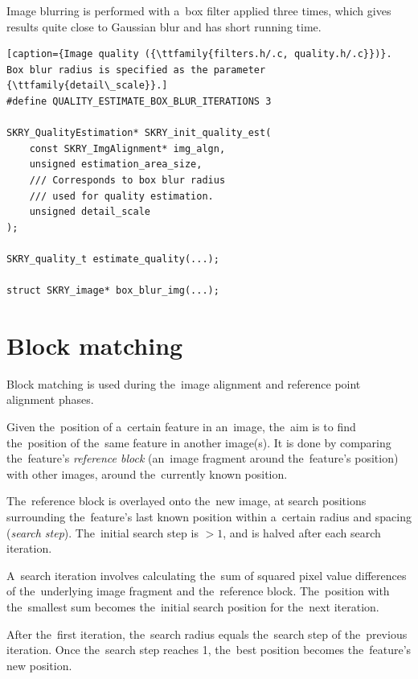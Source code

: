 \documentclass[12pt]{article}
\begin{document}
Image blurring is performed with a~box filter applied three times, which gives results quite close to Gaussian blur and
has short running time.

\begin{lstlisting}[caption={Image quality ({\ttfamily{filters.h/.c, quality.h/.c}})}. Box blur radius is specified as the parameter {\ttfamily{detail\_scale}}.]
#define QUALITY_ESTIMATE_BOX_BLUR_ITERATIONS 3

SKRY_QualityEstimation* SKRY_init_quality_est(
    const SKRY_ImgAlignment* img_algn,
    unsigned estimation_area_size,
    /// Corresponds to box blur radius
    /// used for quality estimation.
    unsigned detail_scale
);

SKRY_quality_t estimate_quality(...);

struct SKRY_image* box_blur_img(...);
\end{lstlisting}

\section{Block matching}\label{sec:blockmatching}

Block matching is used during the~image alignment and reference point alignment phases.

Given the~position of a~certain feature in an~image, the~aim is to find the~position of the~same feature in another
image(s). It is done by comparing the~feature's \emph{reference block} (an~image fragment around the~feature's position)
with other images, around the~currently known position.

The~reference block is overlayed onto the~new image, at search positions surrounding the~feature's last known position
within a~certain radius and spacing (\emph{search step}). The~initial search step is $>1$, and is halved after each
search iteration.

A~search iteration involves calculating the~sum of squared pixel value differences of the~underlying image fragment and
the~reference block. The~position with the~smallest sum becomes the~initial search position for the~next iteration.

After the~first iteration, the~search radius equals the~search step of the~previous iteration. Once the~search step
reaches 1, the~best position becomes the~feature's new position.
\end{document}
